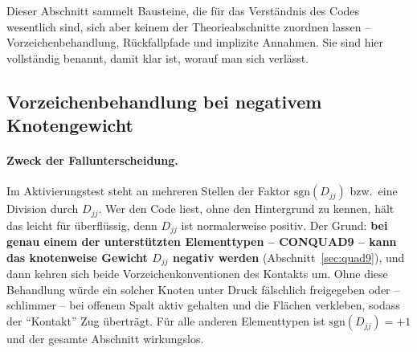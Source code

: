 \documentclass[a4paper,11pt]{article}
\def\tilde#1{#1}%
\begin{document}
Dieser Abschnitt sammelt Bausteine, die für das Verständnis des Codes wesentlich sind, sich aber
keinem der Theorieabschnitte zuordnen lassen -- Vorzeichenbehandlung, Rückfallpfade und implizite
Annahmen. Sie sind hier vollständig benannt, damit klar ist, worauf man sich verlässt.

\subsection{Vorzeichenbehandlung bei negativem Knotengewicht}
\label{sec:sgnd}

\paragraph{Zweck der Fallunterscheidung.}
Im Aktivierungstest steht an mehreren Stellen der Faktor $\mathrm{sgn}(\tilde D_{jj})$ bzw.\ eine
Division durch $\tilde D_{jj}$. Wer den Code liest, ohne den Hintergrund zu kennen, hält das
leicht für überflüssig, denn $\tilde D_{jj}$ ist normalerweise positiv. Der Grund: \textbf{bei
genau einem der unterstützten Elementtypen -- CONQUAD9 -- kann das knotenweise Gewicht
$\tilde D_{jj}$ negativ werden} (Abschnitt~\ref{sec:quad9}), und dann kehren sich beide
Vorzeichenkonventionen des Kontakts um. Ohne diese Behandlung würde ein solcher Knoten unter Druck
fälschlich freigegeben oder -- schlimmer -- bei offenem Spalt aktiv gehalten und die Flächen
verkleben, sodass der ``Kontakt'' Zug überträgt. Für alle anderen Elementtypen ist
$\mathrm{sgn}(\tilde D_{jj})=+1$ und der gesamte Abschnitt wirkungslos.
\end{document}
